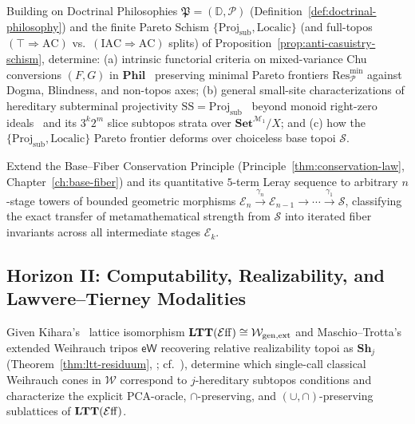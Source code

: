 \begin{problem}\label{prob:open-1}%
%
Building on Doctrinal Philosophies $\mathfrak{P} = (\mathbb{D}, \mathcal{P})$ (Definition~\ref{def:doctrinal-philosophy}) and the finite Pareto Schism $\{\mathrm{Proj}_{\mathrm{sub}}, \mathrm{Localic}\}$ (and full-topos $(\top \Rightarrow \mathrm{AC})$ vs.\ $(\mathrm{IAC} \Rightarrow \mathrm{AC})$ splits) of Proposition~\ref{prop:anti-casuistry-schism}, determine: \textup{(a)} intrinsic functorial criteria on mixed-variance Chu conversions $(F, G)$ in $\mathbf{Phil}$~\cite{Shulman20,HHLN23} preserving minimal Pareto frontiers $\mathrm{Res}_{\mathcal{P}}^{\min}$ against Dogma, Blindness, and non-topos axes; \textup{(b)} general small-site characterizations of hereditary subterminal projectivity $\mathrm{SS} = \mathrm{Proj}_{\mathrm{sub}}$~\cite{FreydScedrov90} beyond monoid right-zero ideals~\cite{HemelaerRogers21} and its $3^k 2^m$ slice subtopos strata over $\mathbf{Set}^{\mathcal{M}_1}/X$; and \textup{(c)} how the $\{\mathrm{Proj}_{\mathrm{sub}}, \mathrm{Localic}\}$ Pareto frontier deforms over choiceless base topoi $\mathcal{S}$.
\end{problem}

\begin{problem}\label{prob:open-2}
Extend the Base--Fiber Conservation Principle (Principle~\ref{thm:conservation-law}, Chapter~\ref{ch:base-fiber}) and its quantitative $5$-term Leray sequence to arbitrary $n$-stage towers of bounded geometric morphisms $\mathcal{E}_n \xrightarrow{\gamma_n} \mathcal{E}_{n-1} \to \cdots \xrightarrow{\gamma_1} \mathcal{S}$, classifying the exact transfer of metamathematical strength from $\mathcal{S}$ into iterated fiber invariants across all intermediate stages $\mathcal{E}_k$.
\end{problem}

\subsection*{Horizon II: Computability, Realizability, and Lawvere--Tierney Modalities}

\begin{problem}\label{prob:open-3}
Given Kihara's~\cite{Kihara23} lattice isomorphism $\mathbf{LTT}(\mathcal{E}\mathrm{ff}) \cong \mathcal{W}_{\mathrm{gen,ext}}$ and Maschio--Trotta's~\cite{MaschioTrotta26} extended Weihrauch tripos $\mathsf{eW}$ recovering relative realizability topoi as $\mathbf{Sh}_j$ (Theorem~\ref{thm:ltt-residuum}, \cite{Hyland82,LeeVanOosten13,vanOosten08}; cf.~\cite{LietzStreicher12}), determine which single-call classical Weihrauch cones in $\mathcal{W}$ correspond to $j$-hereditary subtopos conditions and characterize the explicit PCA-oracle, $\cap$-preserving, and $(\cup, \cap)$-preserving sublattices of $\mathbf{LTT}(\mathcal{E}\mathrm{ff})$.
\end{problem}

